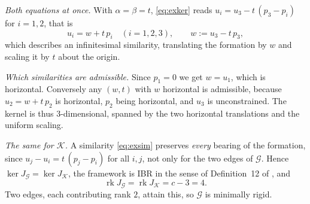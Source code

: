 \documentclass[11pt,a4paper]{article}
\theoremstyle{plain}
\theoremstyle{definition}
\newcommand{\rank}{\operatorname{rk}}
\begin{document}
\emph{Both equations at once.} With $\alpha=\beta=t$, \eqref{eq:exker} reads
$u_i=u_3-t\,(p_3-p_i)$ for $i=1,2$, that is
\begin{equation}\label{eq:exsim}
  u_i=w+t\,p_i \quad (i=1,2,3),
  \qquad w:=u_3-t\,p_3 ,
\end{equation}
which describes an infinitesimal similarity, translating the formation by $w$
and scaling it by $t$ about the origin.

\emph{Which similarities are admissible.} Since $p_1=0$ we get $w=u_1$, which
is horizontal. Conversely any $(w,t)$ with $w$ horizontal is admissible,
because $u_2=w+t\,p_2$ is horizontal, $p_2$ being horizontal, and $u_3$ is
unconstrained. The kernel is thus $3$-dimensional, spanned by the two
horizontal translations and the uniform scaling.

\emph{The same for $\mathcal K$.} A similarity \eqref{eq:exsim} preserves
\emph{every} bearing of the formation, since $u_j-u_i=t\,(p_j-p_i)$ for all
$i,j$, not only for the two edges of $\mathcal G$. Hence
$\ker J_{\mathcal G}=\ker J_{\mathcal K}$, the framework is IBR in the sense of
Definition~12 of \cite{michieletto2021}, and
\begin{equation*}
  \rank J_{\mathcal G}=\rank J_{\mathcal K}=c-3=4 .
\end{equation*}
Two edges, each contributing rank $2$, attain this, so $\mathcal G$ is minimally
rigid.
\end{document}
